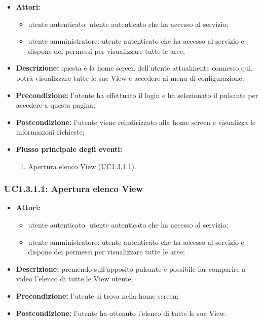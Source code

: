 \begin{itemize}
    \item \textbf{Attori:}
    \begin{itemize}
    	\item utente autenticato: utente autenticato che ha accesso al servizio;
    	\item utente amministratore: utente autenticato che ha accesso al servizio e dispone dei permessi per visualizzare tutte le aree;
	\end{itemize}
    \item \textbf{Descrizione:} questa è la home screen dell'utente attualmente connesso qui, potrà visualizzare tutte le sue View\gloss{} e accedere ai menu di configurazione;
    \item \textbf{Precondizione:} l'utente ha effettuato il login e ha selezionato il pulsante per accedere a questa pagina;
    \item \textbf{Postcondizione:} l'utente viene reindirizzato alla home screen e visualizza le informazioni richieste;
	\item \textbf{Flusso principale degli eventi:}
		\begin{enumerate}
			\item Apertura elenco View\gloss{} (UC1.3.1.1).
		\end{enumerate}
\end{itemize}
\subsubsection{UC1.3.1.1: Apertura elenco View}

\begin{itemize}
    \item \textbf{Attori:}
    \begin{itemize}
    	\item utente autenticato: utente autenticato che ha accesso al servizio;
    	\item utente amministratore: utente autenticato che ha accesso al servizio e dispone dei permessi per visualizzare tutte le aree;
	\end{itemize}
    \item \textbf{Descrizione:} premendo sull'apposito pulsante è possibile far comparire a video l'elenco di tutte le View\gloss{} utente;
    \item \textbf{Precondizione:} l'utente si trova nella home screen;
    \item \textbf{Postcondizione:} l'utente ha ottenuto l'elenco di tutte le sue View\gloss{}.
\end{itemize}

